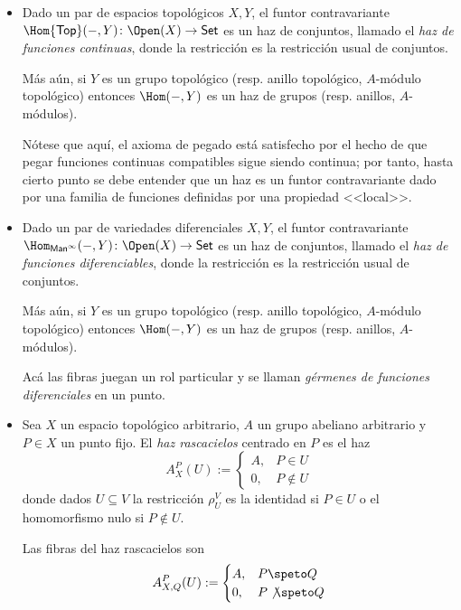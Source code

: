 \begin{ex}
	\begin{itemize}
		\item Dado un par de espacios topológicos $X, Y$, el funtor contravariante $\Hom{\mathsf{Top}}(-, Y) \colon \Open(X) \to \mathsf{Set}$ es
			un haz de conjuntos, llamado el \textit{haz de funciones continuas}, donde la restricción es la restricción usual de conjuntos.

			Más aún, si $Y$ es un grupo topológico (resp. anillo topológico, $A$-módulo topológico) entonces $\Hom(-, Y)$ es un
			haz de grupos (resp. anillos, $A$-módulos).

			Nótese que aquí, el axioma de pegado está satisfecho por el hecho de que pegar funciones continuas compatibles sigue siendo continua;
			por tanto, hasta cierto punto se debe entender que un haz es un funtor contravariante dado por una familia de funciones definidas por una
			propiedad <<local>>.

		\item Dado un par de variedades diferenciales $X, Y$, el funtor contravariante $\Hom_{\mathsf{Man}^\infty} (-, Y) \colon \Open(X) \to \mathsf{Set}$
			es un haz de conjuntos, llamado el \textit{haz de funciones diferenciables}, donde la restricción es la restricción usual de conjuntos.

			Más aún, si $Y$ es un grupo topológico (resp. anillo topológico, $A$-módulo topológico) entonces $\Hom(-, Y)$ es un haz de grupos
			(resp. anillos, $A$-módulos).

			Acá las fibras juegan un rol particular y se llaman \textit{gérmenes de funciones diferenciales} en un punto.

		\item Sea $X$ un espacio topológico arbitrario, $A$ un grupo abeliano arbitrario y $P \in X$ un punto fijo.
			El \textit{haz rascacielos} centrado en $P$ es el haz
			$$ A_X^P(U) :=
			\begin{cases}
				A, & P \in U \\
				0, & P \notin U
			\end{cases} $$
			donde dados $U \subseteq V$ la restricción $\rho^V_U$ es la identidad si $P \in U$ o el homomorfismo nulo si $P \notin U$.

			Las fibras del haz rascacielos son
			$$ A_{X, Q}^P(U) :=
			\begin{cases}
				A, & P     \speto Q \\
				0, & P \not\speto Q
			\end{cases} $$


\end{itemize}
\end{ex}
